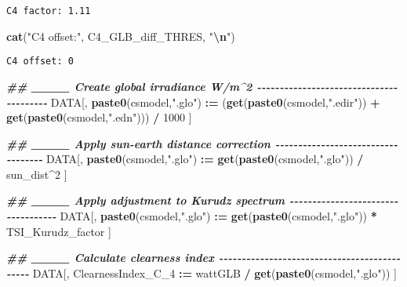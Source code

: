 \documentclass[
  10pt,
  a4paper,oneside]{article}
\newenvironment{Shaded}{\begin{snugshade}}{\end{snugshade}}
\newcommand{\DecValTok}[1]{\textcolor[rgb]{0.00,0.00,0.81}{#1}}
\newcommand{\DocumentationTok}[1]{\textcolor[rgb]{0.56,0.35,0.01}{\textbf{\textit{#1}}}}
\newcommand{\FunctionTok}[1]{\textcolor[rgb]{0.13,0.29,0.53}{\textbf{#1}}}
\newcommand{\NormalTok}[1]{#1}
\newcommand{\SpecialCharTok}[1]{\textcolor[rgb]{0.81,0.36,0.00}{\textbf{#1}}}
\newcommand{\StringTok}[1]{\textcolor[rgb]{0.31,0.60,0.02}{#1}}
\begin{document}
\begin{verbatim}
C4 factor: 1.11 
\end{verbatim}

\begin{Shaded}
\begin{Highlighting}[]
\FunctionTok{cat}\NormalTok{(}\StringTok{"C4 offset:"}\NormalTok{, C4\_GLB\_diff\_THRES, }\StringTok{"}\SpecialCharTok{\textbackslash{}n}\StringTok{"}\NormalTok{)}
\end{Highlighting}
\end{Shaded}

\begin{verbatim}
C4 offset: 0 
\end{verbatim}

\begin{Shaded}
\begin{Highlighting}[]
\DocumentationTok{\#\# \_\_\_\_ Create global irradiance W/m\^{}2  {-}{-}{-}{-}{-}{-}{-}{-}{-}{-}{-}{-}{-}{-}{-}{-}{-}{-}{-}{-}{-}{-}{-}{-}{-}{-}{-}{-}{-}{-}{-}{-}{-}{-}{-}{-}{-}{-}{-}{-}}
\NormalTok{DATA[, }\FunctionTok{paste0}\NormalTok{(csmodel,}\StringTok{".glo"}\NormalTok{) }\SpecialCharTok{:=}\NormalTok{ (}\FunctionTok{get}\NormalTok{(}\FunctionTok{paste0}\NormalTok{(csmodel,}\StringTok{".edir"}\NormalTok{)) }\SpecialCharTok{+} \FunctionTok{get}\NormalTok{(}\FunctionTok{paste0}\NormalTok{(csmodel,}\StringTok{".edn"}\NormalTok{))) }\SpecialCharTok{/} \DecValTok{1000}\NormalTok{ ]}


\DocumentationTok{\#\# \_\_\_\_ Apply sun{-}earth distance correction  {-}{-}{-}{-}{-}{-}{-}{-}{-}{-}{-}{-}{-}{-}{-}{-}{-}{-}{-}{-}{-}{-}{-}{-}{-}{-}{-}{-}{-}{-}{-}{-}{-}{-}{-}}
\NormalTok{DATA[, }\FunctionTok{paste0}\NormalTok{(csmodel,}\StringTok{".glo"}\NormalTok{) }\SpecialCharTok{:=} \FunctionTok{get}\NormalTok{(}\FunctionTok{paste0}\NormalTok{(csmodel,}\StringTok{".glo"}\NormalTok{)) }\SpecialCharTok{/}\NormalTok{ sun\_dist}\SpecialCharTok{\^{}}\DecValTok{2}\NormalTok{ ]}


\DocumentationTok{\#\# \_\_\_\_ Apply adjustment to Kurudz spectrum  {-}{-}{-}{-}{-}{-}{-}{-}{-}{-}{-}{-}{-}{-}{-}{-}{-}{-}{-}{-}{-}{-}{-}{-}{-}{-}{-}{-}{-}{-}{-}{-}{-}{-}{-}}
\NormalTok{DATA[, }\FunctionTok{paste0}\NormalTok{(csmodel,}\StringTok{".glo"}\NormalTok{) }\SpecialCharTok{:=} \FunctionTok{get}\NormalTok{(}\FunctionTok{paste0}\NormalTok{(csmodel,}\StringTok{".glo"}\NormalTok{)) }\SpecialCharTok{*}\NormalTok{ TSI\_Kurudz\_factor ]}


\DocumentationTok{\#\# \_\_\_\_ Calculate clearness index  {-}{-}{-}{-}{-}{-}{-}{-}{-}{-}{-}{-}{-}{-}{-}{-}{-}{-}{-}{-}{-}{-}{-}{-}{-}{-}{-}{-}{-}{-}{-}{-}{-}{-}{-}{-}{-}{-}{-}{-}{-}{-}{-}{-}{-}}
\NormalTok{DATA[, ClearnessIndex\_C\_4 }\SpecialCharTok{:=}\NormalTok{ wattGLB }\SpecialCharTok{/} \FunctionTok{get}\NormalTok{(}\FunctionTok{paste0}\NormalTok{(csmodel,}\StringTok{".glo"}\NormalTok{)) ]}


\end{Highlighting}
\end{Shaded}
\end{document}
